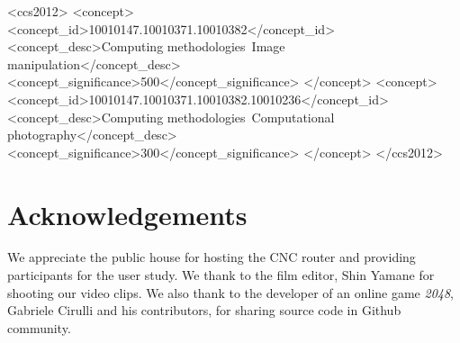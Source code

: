 \documentclass[review]{acmsiggraph}
\begin{document}
\maketitle


\linenumbers

%
%
\begin{CCSXML}
<ccs2012>
<concept>
<concept_id>10010147.10010371.10010382</concept_id>
<concept_desc>Computing methodologies~Image manipulation</concept_desc>
<concept_significance>500</concept_significance>
</concept>
<concept>
<concept_id>10010147.10010371.10010382.10010236</concept_id>
<concept_desc>Computing methodologies~Computational photography</concept_desc>
<concept_significance>300</concept_significance>
</concept>
</ccs2012>
\end{CCSXML}


\keywordlist

\conceptlist

\printcopyright








\section*{Acknowledgements}
We appreciate the public house for hosting the CNC router and providing participants for the user study.
We thank to the film editor, Shin Yamane for shooting our video clips.
We also thank to the developer of an online game \textit{2048}, Gabriele Cirulli and his contributors, for sharing source code in Github community.



\nocite{*}

\end{document}
